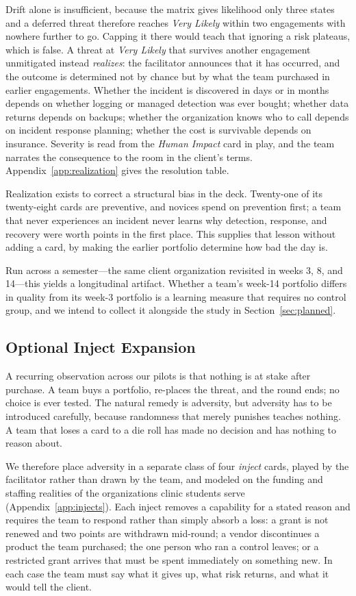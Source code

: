 \documentclass[10pt,twocolumn,letterpaper]{article}
\begin{document}
Drift alone is insufficient, because the matrix gives likelihood only three
states and a deferred threat therefore reaches \emph{Very Likely} within two
engagements with nowhere further to go. Capping it there would teach that
ignoring a risk plateaus, which is false. A threat at \emph{Very Likely} that
survives another engagement unmitigated instead \emph{realizes}: the facilitator
announces that it has occurred, and the outcome is determined not by chance but
by what the team purchased in earlier engagements. Whether the incident is
discovered in days or in months depends on whether logging or managed detection
was ever bought; whether data returns depends on backups; whether the
organization knows who to call depends on incident response planning; whether
the cost is survivable depends on insurance. Severity is read from the
\emph{Human Impact} card in play, and the team narrates the consequence to the
room in the client's terms. Appendix~\ref{app:realization} gives the resolution
table.

Realization exists to correct a structural bias in the deck. Twenty-one of its
twenty-eight cards are preventive, and novices spend on prevention first; a team
that never experiences an incident never learns why detection, response, and
recovery were worth points in the first place. This supplies that lesson without
adding a card, by making the earlier portfolio determine how bad the day is.

Run across a semester---the same client organization revisited in weeks 3, 8,
and 14---this yields a longitudinal artifact. Whether a team's week-14 portfolio
differs in quality from its week-3 portfolio is a learning measure that requires
no control group, and we intend to collect it alongside the study in
Section~\ref{sec:planned}.

\subsection{Optional Inject Expansion}
\label{sec:injects}

A recurring observation across our pilots is that nothing is at stake after
purchase. A team buys a portfolio, re-places the threat, and the round ends;
no choice is ever tested. The natural remedy is adversity, but adversity has to
be introduced carefully, because randomness that merely punishes teaches
nothing. A team that loses a card to a die roll has made no decision and has
nothing to reason about.

We therefore place adversity in a separate class of four \emph{inject} cards,
played by the facilitator rather than drawn by the team, and modeled on the
funding and staffing realities of the organizations clinic students serve
(Appendix~\ref{app:injects}). Each inject removes a capability for a stated
reason and requires the team to respond rather than simply absorb a loss: a
grant is not renewed and two points are withdrawn mid-round; a vendor
discontinues a product the team purchased; the one person who ran a control
leaves; or a restricted grant arrives that must be spent immediately on
something new. In each case the team must say what it gives up, what risk
returns, and what it would tell the client.
\end{document}

